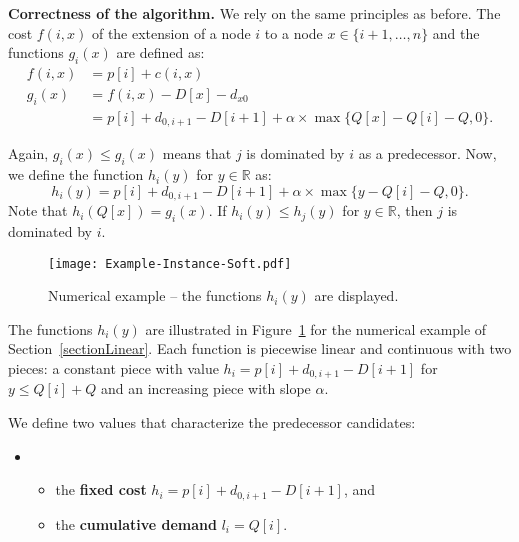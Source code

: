 \documentclass[11pt]{article}
\begin{document}
\noindent
\textbf{Correctness of the algorithm.}
We rely on the same principles as before.
The cost $f(i,x)$ of the extension of a node $i$ to a node $x \in \{i+1,\dots,n\}$ and the functions $g_i(x)$ are  defined as:
\begin{align}
f(i,x) &= p[i] + c(i,x) \\
g_i(x) &= f(i,x) - D[x] - d_{x0} \\
	&= p[i] + d_{0,i+1} - D[i+1] + \alpha \times \max \{ Q[x] - Q[i] - Q , 0 \}.
\end{align}



Again, $g_i(x) \leq g_i(x)$ means that $j$ is dominated by $i$ as a predecessor. 
Now, we define the function $h_i(y)$ for $y \in \mathbb{R}$ as:
\begin{equation}
h_i(y) = p[i] +  d_{0,i+1} - D[i+1] + \alpha \times \max \{ y - Q[i] - Q , 0 \}.
\end{equation}
Note that $h_i(Q[x]) = g_i(x)$.
If $h_i(y) \leq h_j(y)$ for $y \in \mathbb{R}$, then $j$ is dominated by $i$. \\

\begin{figure}[htbp]
\centering
\texttt{[image: Example-Instance-Soft.pdf]}
\caption{Numerical example -- the functions $h_i(y)$ are displayed.}
\label{figure-soft}
\end{figure}

The functions $h_i(y)$ are illustrated in Figure~\ref{figure-soft} for the numerical example of Section~\ref{sectionLinear}.
Each function is piecewise linear and continuous with two pieces: a constant piece with value $h_i = p[i] + d_{0,i+1} - D[i+1]$ for $y \leq Q[i] + Q$ and an increasing piece with slope $\alpha$.

We define two values that characterize the predecessor candidates:
\begin{itemize}[nosep]
\item[]
\begin{itemize}[nosep]
\item the \textbf{fixed cost} $h_i = p[i] + d_{0,i+1} - D[i+1]$, and
\item the \textbf{cumulative demand} $l_i = Q[i]$.
\end{itemize}
\end{itemize}
\end{document}
